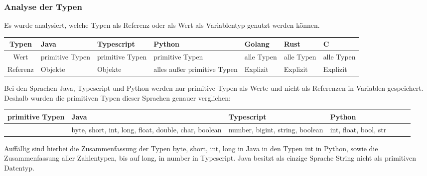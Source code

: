 \documentclass[./einleitung.tex]{subfiles}
\begin{document}
    \subsubsection{Analyse der Typen}
    Es wurde analysiert, welche Typen als Referenz oder als Wert als Variablentyp genutzt werden können.
    \begin{center}
        \begin{tabular}{| c || m{4em} | m{5em} | m{5em} | m{4.5em} | m{4.5em} | m{4.5em} |}
            \hline
            Typen    & Java            & Typescript                           & Python                      & Golang     & Rust       & C          \\
            \hline
            Wert     & primitive Typen & primitive Typen                      & primitive Typen             & alle Typen & alle Typen & alle Typen \\
            \hline
            Referenz & Objekte         & Objekte & alles außer primitive Typen & Explizit & Explizit & Explizit \\
            \hline
        \end{tabular}
    \end{center}
    Bei den Sprachen Java, Typescript und Python werden nur primitive Typen als Werte und nicht als Referenzen in Variablen gespeichert.
    Deshalb wurden die primitiven Typen dieser Sprachen genauer verglichen:
    \begin{center}
        \begin{tabular}{| c || m{7em} | m{7em} | m{7em} | m{4.5em} | m{4.5em} | m{4.5em} |}
            \hline
            primitive Typen & Java & Typescript & Python \\
            \hline
            & byte, short, int, long, float, double, char, boolean
            & number, bigint, string, boolean
            & int, float, bool, str \\
            \hline
        \end{tabular}
    \end{center}
    Auffällig sind hierbei die Zusammenfassung der Typen byte, short, int, long in Java in den Typen int in Python, sowie die Zusammenfassung aller Zahlentypen, bis auf long, in number in Typescript.
    Java besitzt als einzige Sprache String nicht als primitiven Datentyp.
\end{document}
